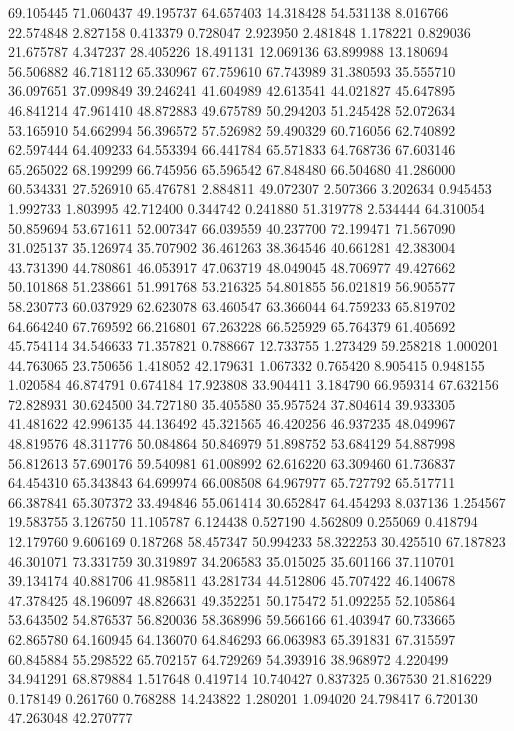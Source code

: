 69.105445
71.060437
49.195737
64.657403
14.318428
54.531138
8.016766
22.574848
2.827158
0.413379
0.728047
2.923950
2.481848
1.178221
0.829036
21.675787
4.347237
28.405226
18.491131
12.069136
63.899988
13.180694
56.506882
46.718112
65.330967
67.759610
67.743989
31.380593
35.555710
36.097651
37.099849
39.246241
41.604989
42.613541
44.021827
45.647895
46.841214
47.961410
48.872883
49.675789
50.294203
51.245428
52.072634
53.165910
54.662994
56.396572
57.526982
59.490329
60.716056
62.740892
62.597444
64.409233
64.553394
66.441784
65.571833
64.768736
67.603146
65.265022
68.199299
66.745956
65.596542
67.848480
66.504680
41.286000
60.534331
27.526910
65.476781
2.884811
49.072307
2.507366
3.202634
0.945453
1.992733
1.803995
42.712400
0.344742
0.241880
51.319778
2.534444
64.310054
50.859694
53.671611
52.007347
66.039559
40.237700
72.199471
71.567090
31.025137
35.126974
35.707902
36.461263
38.364546
40.661281
42.383004
43.731390
44.780861
46.053917
47.063719
48.049045
48.706977
49.427662
50.101868
51.238661
51.991768
53.216325
54.801855
56.021819
56.905577
58.230773
60.037929
62.623078
63.460547
63.366044
64.759233
65.819702
64.664240
67.769592
66.216801
67.263228
66.525929
65.764379
61.405692
45.754114
34.546633
71.357821
0.788667
12.733755
1.273429
59.258218
1.000201
44.763065
23.750656
1.418052
42.179631
1.067332
0.765420
8.905415
0.948155
1.020584
46.874791
0.674184
17.923808
33.904411
3.184790
66.959314
67.632156
72.828931
30.624500
34.727180
35.405580
35.957524
37.804614
39.933305
41.481622
42.996135
44.136492
45.321565
46.420256
46.937235
48.049967
48.819576
48.311776
50.084864
50.846979
51.898752
53.684129
54.887998
56.812613
57.690176
59.540981
61.008992
62.616220
63.309460
61.736837
64.454310
65.343843
64.699974
66.008508
64.967977
65.727792
65.517711
66.387841
65.307372
33.494846
55.061414
30.652847
64.454293
8.037136
1.254567
19.583755
3.126750
11.105787
6.124438
0.527190
4.562809
0.255069
0.418794
12.179760
9.606169
0.187268
58.457347
50.994233
58.322253
30.425510
67.187823
46.301071
73.331759
30.319897
34.206583
35.015025
35.601166
37.110701
39.134174
40.881706
41.985811
43.281734
44.512806
45.707422
46.140678
47.378425
48.196097
48.826631
49.352251
50.175472
51.092255
52.105864
53.643502
54.876537
56.820036
58.368996
59.566166
61.403947
60.733665
62.865780
64.160945
64.136070
64.846293
66.063983
65.391831
67.315597
60.845884
55.298522
65.702157
64.729269
54.393916
38.968972
4.220499
34.941291
68.879884
1.517648
0.419714
10.740427
0.837325
0.367530
21.816229
0.178149
0.261760
0.768288
14.243822
1.280201
1.094020
24.798417
6.720130
47.263048
42.270777
